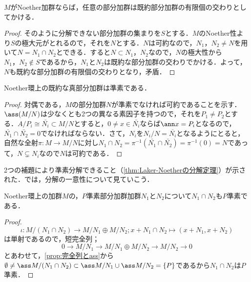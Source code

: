 \begin{lem}
	$M$がNoether加群ならば，任意の部分加群は既約部分加群の有限個の交わりとしてかける．
\end{lem}
\begin{proof}
	そのように分解できない部分加群の集まりを$S$とする．$M$のNoether性より$S$の極大元がとれるので，それを$N$とする．$N$は可約なので，$N_1，N_2\neq N$を用いて$N=N_1\cap N_2$とできる．すると$N\subset N
	_1，N_2$なので，$N$の極大性から$N_1，N_2\not\in S$であるから，$N_1$と$N_2$は既約な部分加群の交わりでかける．よって，$N$も既約な部分加群の有限個の交わりとなり，矛盾．
\end{proof}
\begin{lem}
	Noether環上の既約な真部分加群は準素である．
\end{lem}
\begin{proof}
	対偶である，$M$の部分加群$N$が準素でなければ可約であることを示す．$\ass (M/N)$は少なくとも2つの異なる素因子を持つので，それを$ P_1\neq P_2$とする．$A/ P_i\cong\bar{N_i}\subset M/N$とすると，$0\neq x\in\bar{N_i}$ならば$\ann x= P_i$となるので，$\bar{N_1}\cap\bar{N_2}=0$でなければならない．さて，$N_i$を$N_i/N=\bar{N_i}$となるようにとると，自然な全射$\pi:M\to M/N$に対し$N_1\cap N_2=\pi^{-1}(\bar{N_1}\cap\bar{N_2})=\pi^{-1}(0)=N$であって，$N\subsetneq N_i$なので$N$は可約である．
\end{proof}

2つの補題により準素分解できること（\ref{thm:Laker-Noetherの分解定理}）が示された．では，分解の一意性について見ていこう．
\begin{lem}
	Noether環上の加群$M$の，$P$準素部分加群加群$N_1$と$N_2$について$N_1\cap N_2$も$P$準素である．
\end{lem}
\begin{proof}
	\[\iota:M/(N_1\cap N_2)\longrightarrow M/N_1\oplus M/N_2;x+N_1\cap N_2\longmapsto(x+N_1,x+N_2)\]
	は単射であるので，短完全列；
	\[0\longrightarrow M/N_1\longrightarrow M/N_1\oplus M/N_2\longrightarrow M/N_2\longrightarrow0\]
	とあわせて，\ref{prop:完全列とass}から$\emptyset\neq\ass M/(N_1\cap N_2)\subset\ass M/N_1\cup\ass M/N_2=\{P\}$であるから$N_1\cap N_2$は$P$準素．
\end{proof}

